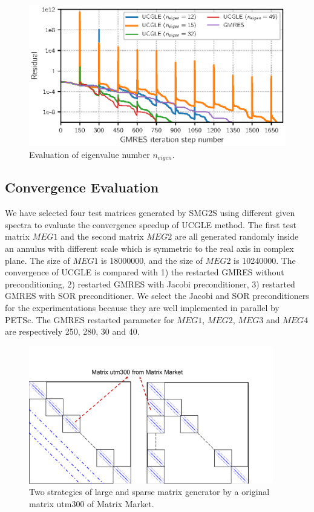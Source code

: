 \begin{figure}[htbp]
	\centering
	\includegraphics[width=6.2in]{fig/conv_eigenvalues.eps}
	\caption{Evaluation of eigenvalue number $n_{eigen}$.}
	\label{fig:vals}
\end{figure}

\subsection{Convergence Evaluation}

We have selected four test matrices generated by SMG2S using different given spectra to evaluate the convergence speedup of UCGLE method. The first test matrix $MEG1$ and the second matrix $MEG2$ are all generated randomly inside an annulus with different scale which is symmetric to the real axis in complex plane. The size of $MEG1$ is \num[round-precision=2,round-mode=figures]{18000000}, and the size of $MEG2$ is \num[round-precision=4,round-mode=figures]{10240000}. The convergence of UCGLE is compared with 1) the restarted GMRES without preconditioning, 2) restarted GMRES with Jacobi preconditioner, 3) restarted GMRES with SOR preconditioner. We select the Jacobi and SOR preconditioners for the experimentations because they are well implemented in parallel by PETSc. The GMRES restarted parameter for $MEG1$, $MEG2$, $MEG3$ and $MEG4$ are respectively 250, 280, 30 and 40.

\begin{figure}[htbp]
	\centering
	\includegraphics[width=4.2in]{fig/matrix_generator.pdf}
	\caption{Two strategies of large and sparse matrix generator by a original matrix utm300 of Matrix Market.}
	\label{fig:matrix}
\end{figure}


